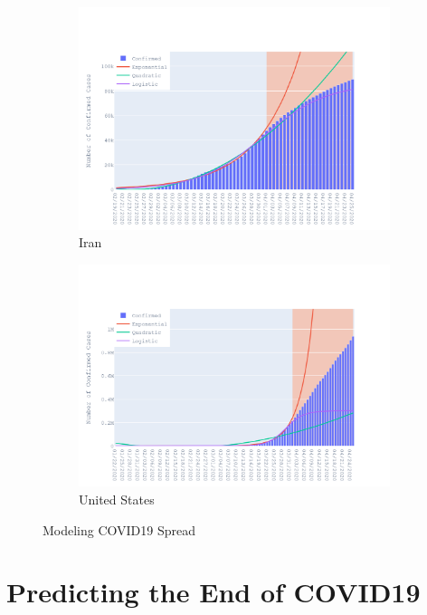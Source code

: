 \documentclass{homework}
\begin{document}
\begin{figure}[H]
  \begin{subfigure}{0.45\linewidth}
    \includegraphics[width=\linewidth]{task1/Iran.png}
    \caption{Iran}
  \end{subfigure}
  \hfil
  \begin{subfigure}{0.45\linewidth}
    \includegraphics[width=\linewidth]{task1/United States.png}
    \caption{United States}
  \end{subfigure}

  \caption{Modeling COVID19 Spread}
  \label{fig:task1}
\end{figure}

\newpage
\section{Predicting the End of COVID19}
\end{document}
